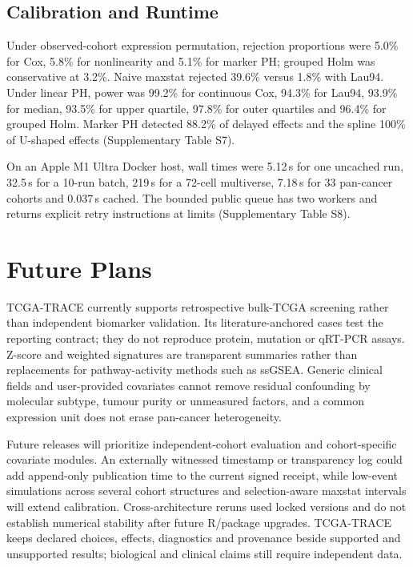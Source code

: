 \documentclass[12pt]{article}
\begin{document}
\subsection{Calibration and Runtime}

Under observed-cohort expression permutation, rejection proportions were
5.0\% for Cox, 5.8\% for nonlinearity and 5.1\% for marker PH; grouped Holm
was conservative at 3.2\%. Naive maxstat rejected 39.6\% versus 1.8\% with
Lau94. Under linear PH, power was 99.2\% for continuous Cox, 94.3\% for
Lau94, 93.9\% for median, 93.5\% for upper quartile, 97.8\% for outer
quartiles and 96.4\% for grouped Holm. Marker PH detected 88.2\% of delayed
effects and the spline 100\% of U-shaped effects (Supplementary Table S7).

On an Apple M1 Ultra Docker host, wall times were 5.12\,s for one uncached run,
32.5\,s for a 10-run batch, 219\,s for a 72-cell multiverse, 7.18\,s for 33
pan-cancer cohorts and 0.037\,s cached. The bounded public queue has two workers
and returns explicit retry instructions at limits (Supplementary Table S8).

\section{Future Plans}

TCGA-TRACE currently supports retrospective bulk-TCGA screening rather than
independent biomarker validation. Its literature-anchored cases test the
reporting contract; they do not reproduce protein, mutation or qRT-PCR assays.
Z-score and weighted signatures are transparent summaries rather than
replacements for pathway-activity methods such as ssGSEA. Generic clinical
fields and user-provided covariates cannot remove residual confounding by
molecular subtype, tumour purity or unmeasured factors, and a common expression
unit does not erase pan-cancer heterogeneity.

Future releases will prioritize independent-cohort evaluation and
cohort-specific covariate modules. An externally witnessed timestamp or
transparency log could add append-only publication time to the current signed
receipt, while low-event simulations across several cohort structures and
selection-aware maxstat intervals will extend calibration. Cross-architecture
reruns used locked versions and do not establish numerical stability after
future R/package upgrades. TCGA-TRACE keeps declared choices, effects,
diagnostics and provenance beside supported and unsupported results;
biological and clinical claims still require independent data.
\end{document}
